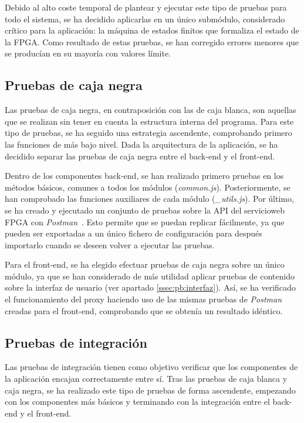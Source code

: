 Debido al alto coste temporal de plantear y ejecutar este tipo de pruebas para todo el sistema, se ha decidido aplicarlas en un único submódulo, considerado crítico para la aplicación: la máquina de estados finitos que formaliza el estado de la \gls{FPGA}.
Como resultado de estas pruebas, se han corregido errores menores que se producían en su mayoría con valores límite.

\subsection*{Pruebas de caja negra\label{ssec:pb:caja_negra}}

Las pruebas de caja negra, en contraposición con las de caja blanca, son aquellas que se realizan sin tener en cuenta la estructura interna del programa.
Para este tipo de pruebas, se ha seguido una estrategia ascendente, comprobando primero las funciones de más bajo nivel.
Dada la arquitectura de la aplicación, se ha decidido separar las pruebas de caja negra entre el \gls{back-end} y el \gls{front-end}.

Dentro de los componentes \gls{back-end}, se han realizado primero pruebas en los métodos básicos, comunes a todos los módulos (\textit{common.js}).
Posteriormente, se han comprobado las funciones auxiliares de cada módulo (\textit{\_utils.js}).
Por último, se ha creado y ejecutado un conjunto de pruebas sobre la \gls{API} del \gls{servicioweb} \gls{FPGA} con \textit{Postman}~\cite{postman}.
Esto permite que se puedan replicar fácilmente, ya que pueden ser exportadas a un único fichero de configuración para después importarlo cuando se deseen volver a ejecutar las pruebas.

Para el \gls{front-end}, se ha elegido efectuar pruebas de caja negra sobre un único módulo, ya que se han considerado de más utilidad aplicar pruebas de contenido sobre la interfaz de usuario (ver apartado \ref{ssec:pb:interfaz}).
Así, se ha verificado el funcionamiento del \gls{proxy} haciendo uso de las mismas pruebas de \textit{Postman} creadas para el \gls{front-end}, comprobando que se obtenía un resultado idéntico.

\subsection*{Pruebas de integración\label{ssec:pb:integracion}}

Las pruebas de integración tienen como objetivo verificar que los componentes de la aplicación encajan correctamente entre sí.
Tras las pruebas de caja blanca y caja negra, se ha realizado este tipo de pruebas de forma ascendente, empezando con los componentes más básicos y terminando con la integración entre el \gls{back-end} y el \gls{front-end}.

